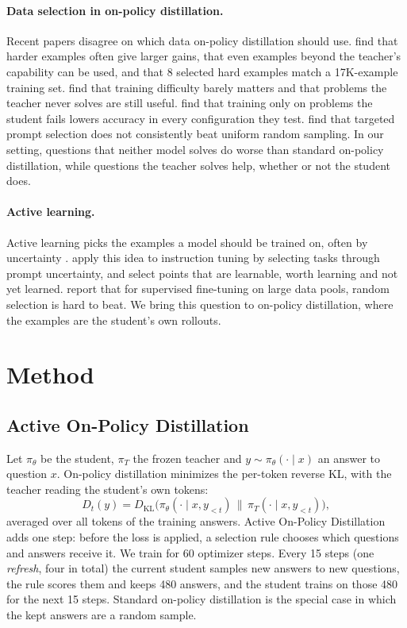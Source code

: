 \documentclass[11pt]{article}
\begin{document}
\paragraph{Data selection in on-policy distillation.}
Recent papers disagree on which data on-policy distillation should use.
\citet{hou2026whatmatters} find that harder examples often give larger gains, that even examples beyond the teacher's capability can be used, and that 8 selected hard examples match a 17K-example training set.
\citet{li2026everycoin} find that training difficulty barely matters and that problems the teacher never solves are still useful.
\citet{yang2026correcting} find that training only on problems the student fails lowers accuracy in every configuration they test.
\citet{wang2026beyondprompt} find that targeted prompt selection does not consistently beat uniform random sampling.
In our setting, questions that neither model solves do worse than standard on-policy distillation, while questions the teacher solves help, whether or not the student does.

\paragraph{Active learning.}
Active learning picks the examples a model should be trained on, often by uncertainty \citep{settles2009active}.
\citet{kung2023active} apply this idea to instruction tuning by selecting tasks through prompt uncertainty, and \citet{mindermann2022rholoss} select points that are learnable, worth learning and not yet learned.
\citet{xia2024random} report that for supervised fine-tuning on large data pools, random selection is hard to beat.
We bring this question to on-policy distillation, where the examples are the student's own rollouts.

\section{Method}
\label{sec:method}

\subsection{Active On-Policy Distillation}
Let $\pi_\theta$ be the student, $\pi_T$ the frozen teacher and $y \sim \pi_\theta(\cdot \mid x)$ an answer to question $x$.
On-policy distillation minimizes the per-token reverse KL, with the teacher reading the student's own tokens:
\begin{equation}
D_t(y) = D_{\mathrm{KL}}\big(\pi_\theta(\cdot \mid x, y_{<t}) \,\|\, \pi_T(\cdot \mid x, y_{<t})\big),
\end{equation}
averaged over all tokens of the training answers.
Active On-Policy Distillation adds one step: before the loss is applied, a selection rule chooses which questions and answers receive it.
We train for 60 optimizer steps.
Every 15 steps (one \emph{refresh}, four in total) the current student samples new answers to new questions, the rule scores them and keeps 480 answers, and the student trains on those 480 for the next 15 steps.
Standard on-policy distillation is the special case in which the kept answers are a random sample.
\end{document}
